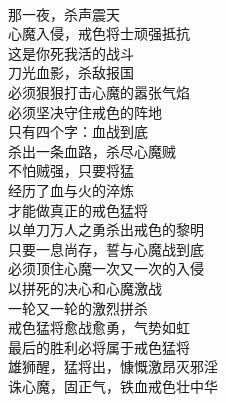 \begin{adjustwidth}{-0.5em}{-0.5em}
    \begin{poem}[戒色猛将传]
        \begin{multicols}{3}
            \centering~\\
            那一夜，杀声震天 \\ 心魔入侵，戒色将士顽强抵抗 \\ 这是你死我活的战斗 \\ 刀光血影，杀敌报国 \\ 必须狠狠打击心魔的嚣张气焰 \\ 必须坚决守住戒色的阵地 \\ 只有四个字：血战到底 \\ 杀出一条血路，杀尽心魔贼 \\ 不怕贼强，只要将猛 \\ 经历了血与火的淬炼 \\ 才能做真正的戒色猛将 \\ 以单刀万人之勇杀出戒色的黎明 \\ 只要一息尚存，誓与心魔战到底 \\ 必须顶住心魔一次又一次的入侵 \\ 以拼死的决心和心魔激战 \\ 一轮又一轮的激烈拼杀 \\ 戒色猛将愈战愈勇，气势如虹 \\ 最后的胜利必将属于戒色猛将 \\ 雄狮醒，猛将出，慷慨激昂灭邪淫 \\ 诛心魔，固正气，铁血戒色壮中华
        \end{multicols}
    \end{poem}
\end{adjustwidth}

